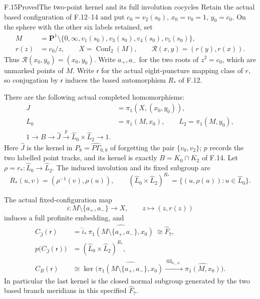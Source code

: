 \begin{claim}{F.15}{Proved}{The two-point kernel and its full involution cocycles}
Retain the actual based configuration of F.12--14 and put
$c_0=v_2(s_0)$, $x_0=v_0=1$, $y_0=c_0$.  On the sphere
with the other six labels retained, set
\[
\begin{split}
 M&=\mathbf P^1\setminus
       \{0,\infty,v_1(s_0),v_3(s_0),v_4(s_0),v_5(s_0)\},\\
 r(z)&=c_0/z,\qquad
 X=\operatorname{Conf}_2(M),\qquad
 \mathcal R(x,y)=(r(y),r(x)).
\end{split}                                                     \tag{F.15.1}
\]
Thus $\mathcal R(x_0,y_0)=(x_0,y_0)$.  Write $a_+,a_-$
for the two roots of $z^2=c_0$, which are unmarked points of
$M$.  Write $\mathsf r$ for the actual eight-puncture
mapping class of $r$, so conjugation by $\mathsf r$ induces
the based automorphism $R_*$ of F.12.

There are the following actual completed homomorphisms:
\[
\begin{split}
 J&=\pi_1(X,(x_0,y_0)),\\
 L_0&=\pi_1(M,x_0),\qquad L_2=\pi_1(M,y_0),\\
 1\longrightarrow B\longrightarrow\widehat J
   \xrightarrow{\ p\ }\widehat L_0\times\widehat L_2
     \longrightarrow1 .
\end{split}                                                     \tag{F.15.2}
\]
Here $\widehat J$ is the kernel in
$P_8=\widehat{P\Gamma}_{0,8}$ of forgetting the pair
$\{v_0,v_2\}$; $p$ records the two labelled point tracks,
and its kernel is exactly $B=K_0\cap K_2$ of F.14.
Let $\rho=r_*:\widehat L_0\longrightarrow\widehat L_2$.
The induced involution and its fixed subgroup are
\[
 R_*(u,v)=(\rho^{-1}(v),\rho(u)),\qquad
 (\widehat L_0\times\widehat L_2)^{R_*}
        =\{(u,\rho(u)):u\in\widehat L_0\}.                       \tag{F.15.3}
\]

The actual fixed-configuration map
\[
 i:M\setminus\{a_+,a_-\}\longrightarrow X,\qquad
                         z\longmapsto(z,r(z))                 \tag{F.15.4}
\]
induces a full profinite embedding, and
\[
\begin{split}
 C_{\widehat J}(\mathsf r)
   &=\widehat i_*\,
        \widehat{\pi_1(M\setminus\{a_+,a_-\},x_0)}
       \ \cong\widehat F_7,\\
 p\bigl(C_{\widehat J}(\mathsf r)\bigr)
   &=(\widehat L_0\times\widehat L_2)^{R_*},\\
 C_B(\mathsf r)
   &\cong\ker\bigl(
       \widehat{\pi_1(M\setminus\{a_+,a_-\},x_0)}
           \xrightarrow{\ \mathrm{fill}_{a_+,a_-}\ }
                  \widehat{\pi_1(M,x_0)}\bigr).
\end{split}                                                     \tag{F.15.5}
\]
In particular the last kernel is the closed normal subgroup
generated by the two based branch meridians in this
specified $\widehat F_7$.


\end{claim}
